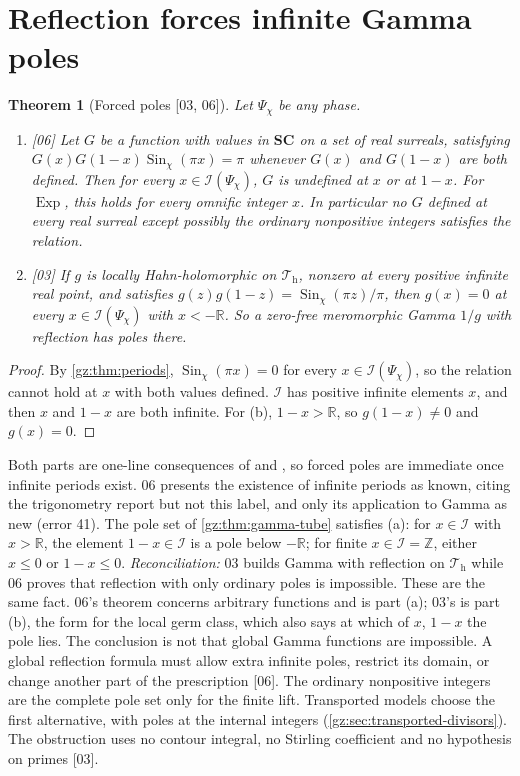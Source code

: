 \documentclass[11pt,a4paper]{article}
\numberwithin{equation}{section}
\newtheorem{theorem}{Theorem}[section]
\theoremstyle{definition}
\theoremstyle{remark}
\newcommand{\SC}{\mathbf{SC}}
\newcommand{\R}{\mathbb R}
\newcommand{\Z}{\mathbb Z}
\newcommand{\Exp}{\operatorname{Exp}}
\newcommand{\Sin}{\operatorname{Sin}}
\newcommand{\cI}{\mathcal I}
\newcommand{\Th}{\mathcal T_{\mathrm h}}
\newcommand{\src}[1]{\textup{[#1]}}
\begin{document}
\section{Reflection forces infinite Gamma poles}\label{gz:sec:forced}
\begin{theorem}[Forced poles \src{03, 06}]\label{gz:thm:forced}
Let $\Psi_\chi$ be any phase.
\begin{enumerate}[label=(\alph*)]
\item \src{06} Let $G$ be a function with values in $\SC$ on a set of real
 surreals, satisfying $G(x)G(1-x)\Sin_\chi(\pi x)=\pi$ whenever $G(x)$ and
 $G(1-x)$ are both defined. Then for every $x\in\cI(\Psi_\chi)$, $G$ is
 undefined at $x$ or at $1-x$. For $\Exp$, this holds for every omnific
 integer $x$. In particular no $G$ defined at every real surreal except
 possibly the \emph{ordinary} nonpositive integers satisfies the relation.
\item \src{03} If $g$ is locally Hahn-holomorphic on $\Th$, nonzero at every
 positive infinite real point, and satisfies $g(z)g(1-z)=\Sin_\chi(\pi z)/\pi$,
 then $g(x)=0$ at every $x\in\cI(\Psi_\chi)$ with $x<-\R$. So a zero-free
 meromorphic Gamma $1/g$ with reflection has poles there.
\end{enumerate}
\end{theorem}
\begin{proof}
By \cref{gz:thm:periods}, $\Sin_\chi(\pi x)=0$ for every $x\in\cI(\Psi_\chi)$,
so the relation cannot hold at $x$ with both values defined. $\cI$ has
positive infinite elements $x$, and then $x$ and $1-x$ are both infinite.
For (b), $1-x>\R$, so $g(1-x)\ne0$ and $g(x)=0$.
\end{proof}
Both parts are one-line consequences of 
and , so forced poles are immediate once
infinite periods exist. 06 presents the existence of infinite periods as
known, citing the trigonometry report but not this label, and only its
application to Gamma as new (error 41). The pole set of \cref{gz:thm:gamma-tube} satisfies (a): for
$x\in\cI$ with $x>\R$, the element $1-x\in\cI$ is a pole below $-\R$; for
finite $x\in\cI=\Z$, either $x\le0$ or $1-x\le0$. \emph{Reconciliation:} 03
builds Gamma with reflection on $\Th$ while 06 proves that reflection with
only ordinary poles is impossible. These are the same fact. 06's theorem
concerns arbitrary functions and is part (a); 03's is part (b), the form for
the local germ class, which also says at which of $x$, $1-x$ the pole lies.
The conclusion is not that global Gamma
functions are impossible. A global reflection formula must allow extra
infinite poles, restrict its domain, or change another part of the
prescription \src{06}. The ordinary nonpositive integers are the complete
pole set only for the finite lift. Transported models choose the first
alternative, with poles at the internal integers
(\cref{gz:sec:transported-divisors}). The obstruction uses no contour
integral, no Stirling coefficient and no hypothesis on primes \src{03}.
\end{document}
